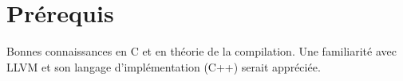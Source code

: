 \documentclass[a4paper,10pt]{article}
\begin{document}
\section{Prérequis}

Bonnes connaissances en C et en théorie de la compilation. Une
familiarité avec LLVM et son langage d'implémentation (C++) serait
appréciée.





{\scriptsize }
\end{document}

